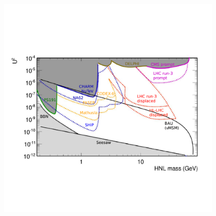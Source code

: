 \begin{figure}[h]
\centering
    \includegraphics[clip,trim=0.5cm 3.5cm 1.cm 3cm, width=.68\textwidth]{Figures/c7/projection_alimena.pdf}
\caption{ ~\cite{Alimena_2020}}
\label{fig:HL_alimena}
\end{figure}


\vspace {5cm}













